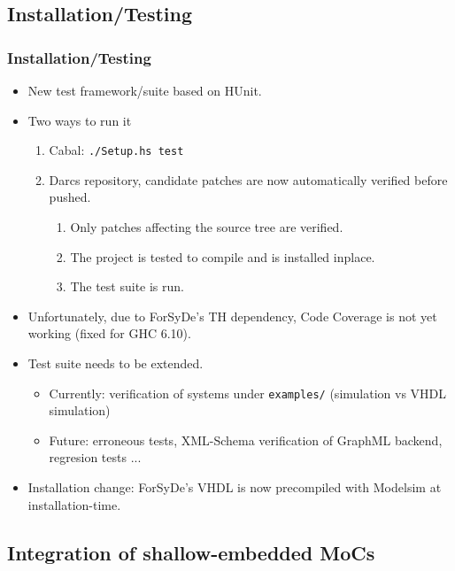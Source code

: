 \documentclass{beamer}
\begin{document}
\subsection{Installation/Testing}

\begin{frame}
  \frametitle{Installation/Testing}
  \begin{itemize}
  \item New test framework/suite based on HUnit.
  \item Two ways to run it
    \begin{enumerate}
    \item Cabal: \texttt{./Setup.hs test}
    \item Darcs repository, candidate patches are now automatically
      verified before pushed.
      \begin{enumerate}
      \item Only patches affecting the source tree are verified.
      \item The project is tested to compile and is installed inplace.
      \item The test suite is run.
      \end{enumerate}
    \end{enumerate}
  \item Unfortunately, due to ForSyDe's TH dependency, Code Coverage is not
    yet working (fixed for GHC 6.10).
  \item Test suite needs to be extended.
    \begin{itemize}
    \item Currently: verification of systems under
      \texttt{examples/} (simulation vs VHDL simulation)
    \item Future: erroneous tests, XML-Schema verification of
      GraphML backend, regresion tests ...
    \end{itemize}
  \item Installation change: ForSyDe's VHDL is now precompiled with Modelsim at
    installation-time.
  \end{itemize}
    
\end{frame}

\subsection{Integration of shallow-embedded MoCs}
\end{document}
